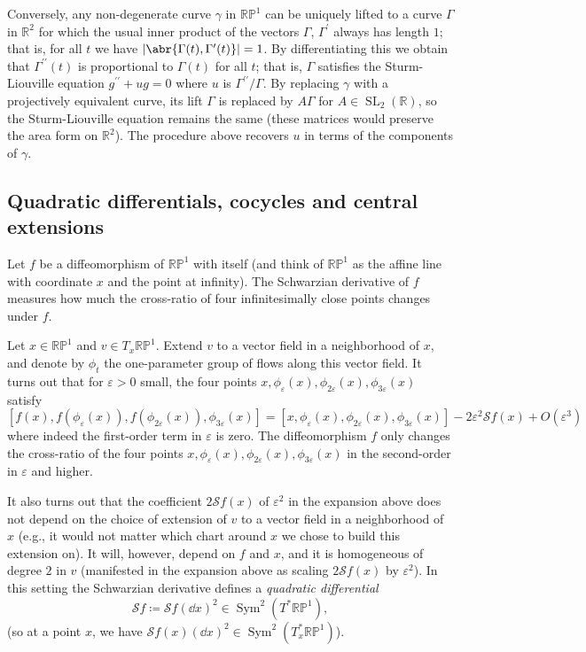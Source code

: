 \documentclass[11pt,leqno]{article}
\theoremstyle{plain}
\theoremstyle{definition}
\numberwithin{equation}{section}
\numberwithin{lem}{section}
\DeclareMathOperator{\Sym}{Sym}
\DeclareMathOperator{\SL}{SL}
\begin{document}
Conversely, any non-degenerate curve $\gamma$ in $\mathbb{RP}^1$ can be uniquely lifted to a curve $\Gamma$ in $\mathbb R^2$ for which the usual inner product of the vectors $\Gamma$, $\Gamma^\prime$ always has length $1$; that is, for all $t$ we have $\abs{\abr{\Gamma(t),\Gamma^\prime(t)}} = 1$. By differentiating this we obtain that $\Gamma^{\prime\prime}(t)$ is proportional to $\Gamma(t)$ for all $t$; that is, $\Gamma$ satisfies the Sturm-Liouville equation $g^{\prime\prime} + ug = 0$ where $u$ is $\Gamma^{\prime\prime}/\Gamma$. By replacing $\gamma$ with a projectively equivalent curve, its lift $\Gamma$ is replaced by $A\Gamma$ for $A\in \SL_2(\mathbb R)$, so the Sturm-Liouville equation remains the same (these matrices would preserve the area form on $\mathbb R^2$). The procedure above recovers $u$ in terms of the components of $\gamma$.

\subsection{Quadratic differentials, cocycles and central extensions}\label{s: cocycle}
Let $f$ be a diffeomorphism of $\mathbb{RP}^1$ with itself (and think of $\mathbb{RP}^1$ as the affine line with coordinate $x$ and the point at infinity). The Schwarzian derivative of $f$ measures how much the cross-ratio of four infinitesimally close points changes under $f$.

Let $x\in\mathbb{RP}^1$ and $v\in T_x\mathbb{RP}^1$. Extend $v$ to a vector field in a neighborhood of $x$, and denote by $\phi_t$ the one-parameter group of flows along this vector field. It turns out that for $\varepsilon> 0$ small, the four points $x, \phi_{\varepsilon}(x), \phi_{2\varepsilon}(x), \phi_{3\varepsilon}(x)$ satisfy 
\[[f(x),f(\phi_{\varepsilon}(x)), f(\phi_{2\varepsilon}(x)), \phi_{3\varepsilon}(x)] = [x,\phi_{\varepsilon}(x), \phi_{2\varepsilon}(x), \phi_{3\varepsilon}(x)] - 2\varepsilon^2\mathscr Sf(x) + O(\varepsilon^3)\]
where indeed the first-order term in $\varepsilon$ is zero. The diffeomorphism $f$ only changes the cross-ratio of the four points $x, \phi_{\varepsilon}(x), \phi_{2\varepsilon}(x), \phi_{3\varepsilon}(x)$ in the second-order in $\varepsilon$ and higher.

It also turns out that the coefficient $2\mathscr Sf(x)$ of $\varepsilon^2$ in the expansion above does not depend on the choice of extension of $v$ to a vector field in a neighborhood of $x$ (e.g., it would not matter which chart around $x$ we chose to build this extension on). It will, however, depend on $f$ and $x$, and it is homogeneous of degree $2$ in $v$ (manifested in the expansion above as scaling $2\mathscr Sf(x)$ by $\varepsilon^2$). In this setting the Schwarzian derivative defines a \textit{quadratic differential} 
\[\mathscr Sf \coloneqq \mathscr Sf(\dd x)^2\in \Sym^2(T^\ast\mathbb{RP}^1),\]
(so at a point $x$, we have $\mathscr Sf(x)(\dd x)^2\in \Sym^2(T^\ast_x\mathbb{RP}^1)$).
\end{document}
